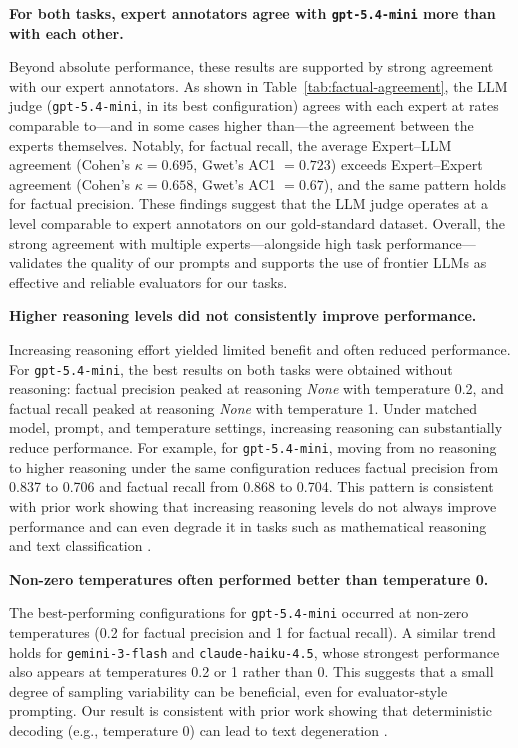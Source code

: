 \documentclass{article}
\newcommand{\xhdr}[1]{%
  \noindent\textbf{#1.}
}
\begin{document}
\xhdr{For both tasks, expert annotators agree with \texttt{gpt-5.4-mini} more than with each other}
Beyond absolute performance, these results are supported by strong agreement with our expert annotators. As shown in Table~\ref{tab:factual-agreement}, the LLM judge (\texttt{gpt-5.4-mini}, in its best configuration) agrees with each expert at rates comparable to—and in some cases higher than—the agreement between the experts themselves. Notably, for factual recall, the average Expert--LLM agreement (Cohen's $\kappa = 0.695$, Gwet's AC1 $= 0.723$) exceeds Expert--Expert agreement (Cohen's $\kappa = 0.658$, Gwet's AC1 $= 0.67$), and the same pattern holds for factual precision. These findings suggest that the LLM judge  operates at a level comparable to expert annotators on our gold-standard dataset. Overall, the strong agreement with multiple experts---alongside high task performance---validates the quality of our prompts and supports the use of frontier LLMs as effective and reliable evaluators for our tasks.


\xhdr{Higher reasoning levels did not consistently improve performance}
Increasing reasoning effort yielded limited benefit and often reduced performance. For \texttt{gpt-5.4-mini}, the best results on both tasks were obtained without reasoning: factual precision peaked at reasoning \textit{None} with temperature 0.2, and factual recall peaked at reasoning \textit{None} with temperature 1. Under matched model, prompt, and temperature settings, increasing reasoning can substantially reduce performance. For example, for \texttt{gpt-5.4-mini}, moving from no reasoning to higher reasoning under the same configuration reduces factual precision from 0.837 to 0.706 and factual recall from 0.868 to 0.704. This pattern is consistent with prior work showing that increasing reasoning levels do not always improve performance and can even degrade it in tasks such as mathematical reasoning and text classification \cite{ballon2025relationshipreasoningperformancelarge, phutane2025ableistintersectionaldisabilitybias}.

\xhdr{Non-zero temperatures often performed better than temperature 0}
The best-performing configurations for \texttt{gpt-5.4-mini} occurred at non-zero temperatures (0.2 for factual precision and 1 for factual recall). A similar trend holds for \texttt{gemini-3-flash} and \texttt{claude-haiku-4.5}, whose strongest performance also appears at temperatures 0.2 or 1 rather than 0. This suggests that a small degree of sampling variability can be beneficial, even for evaluator-style prompting. Our result is consistent with prior work showing that deterministic decoding (e.g., temperature 0) can lead to text degeneration \cite{holtzman2019curious}.
\end{document}
